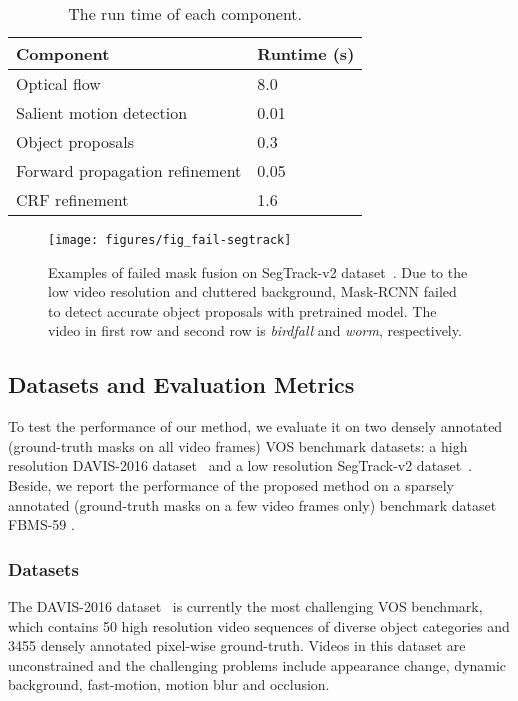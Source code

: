 \documentclass[journal]{IEEEtran}
\begin{document}
\begin{table}
	\centering 
    \caption{The run time of each component.}
    \begin{tabular}{L{32ex}|C{12ex}} 
    \toprule
    Component                       & Runtime (s) \\ \midrule
    Optical flow                    & 8.0~~~      \\
    Salient motion detection        & 0.01        \\
    Object proposals                & 0.3~~~      \\
    Forward propagation refinement  & 0.05        \\ 
    CRF refinement                  & 1.6~~~      \\ 
    \bottomrule
    \end{tabular}
    \label{tbl_time}
\end{table}  
\begin{figure*}[!t]
	\centerline{\texttt{[image: figures/fig\_fail-segtrack]}}
	\caption{Examples of failed mask fusion on SegTrack-v2 dataset~\cite{ICCV2013_Li}. 
	Due to the low video resolution and cluttered background, 
	Mask-RCNN \cite{ICCV2017_He} failed to detect accurate object proposals with pretrained model. 
	The video in first row and second row is \emph{birdfall} and \emph{worm}, respectively.}
	\label{fig_fail-segtrack}
\end{figure*} 
\subsection{Datasets and Evaluation Metrics}
To test the performance of our method, 
we evaluate it on two densely annotated (ground-truth masks on all video frames) VOS benchmark datasets: a high resolution DAVIS-2016 dataset~\cite{CVPR2016_Perazzi} and a low resolution SegTrack-v2 dataset~\cite{ICCV2013_Li}. Beside, we report the performance of the proposed method on a sparsely annotated (ground-truth masks on a few video frames only) benchmark dataset FBMS-59 \cite{TPAMI2014_Ochs}.

\subsubsection{Datasets}
The DAVIS-2016 dataset~\cite{CVPR2016_Perazzi} is currently the most challenging VOS benchmark, 
which contains 50 high resolution video sequences of diverse object categories and 3455 densely annotated pixel-wise ground-truth. 
Videos in this dataset are unconstrained and the challenging problems include appearance change, dynamic background, fast-motion, motion blur and occlusion.
\end{document}
